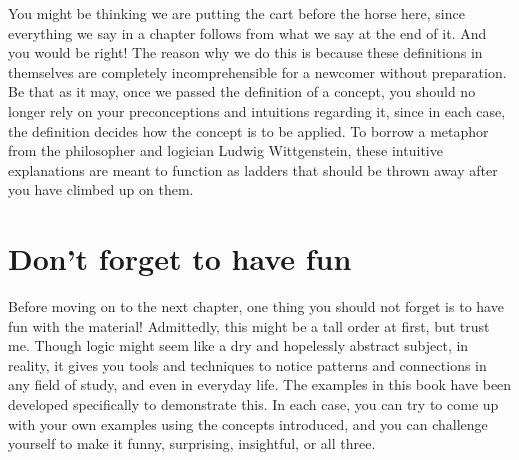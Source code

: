 You might be thinking we are putting the cart before the horse here, since everything we say in a chapter follows from what we say at the end of it. And you would be right! The reason why we do this is because these definitions in themselves are completely incomprehensible for a newcomer without preparation. Be that as it may, once we passed the definition of a concept, you should no longer rely on your preconceptions and intuitions regarding it, since in each case, the definition decides how the concept is to be applied. To borrow a metaphor from the philosopher and logician Ludwig Wittgenstein, these intuitive explanations are meant to function as ladders that should be thrown away after you have climbed up on them. 

\section*{Don't forget to have fun}

Before moving on to the next chapter, one thing you should not forget is to have fun with the material! Admittedly, this might be a tall order at first, but trust me. Though logic might seem like a dry and hopelessly abstract subject, in reality, it gives you tools and techniques to notice patterns and connections in any field of study, and even in everyday life. The examples in this book have been developed specifically to demonstrate this. In each case, you can try to come up with your own examples using the concepts introduced, and you can challenge yourself to make it funny, surprising, insightful, or all three. 